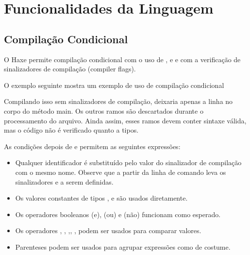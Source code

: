 \chapter{Funcionalidades da Linguagem}
\label{lf}

\section{Compilação Condicional}
\label{lf-condition-compilation}

O Haxe permite compilação condicional com o uso de ,  e  e com a verificação de sinalizadores de compilação (compiler flags).


O exemplo seguinte mostra um exemplo de uso de compilação condicional



Compilando isso sem sinalizadores de compilação, deixaria apenas a linha  no corpo do método main. Os outros ramos são descartados durante o processamento do arquivo. Ainda assim, esses ramos devem conter sintaxe válida, mas o código não é verificado quanto a tipos.

As condições depois de  e  permitem as seguintes expressões:

\begin{itemize}
    \item Qualquer identificador é substituído pelo valor do sinalizador de compilação com o mesmo nome. Observe que  a partir da linha de comando leva os sinalizadores  e  a serem definidas.
    \item Os valores constantes de tipos ,  e  são usados diretamente.
    \item Os operadores booleanos \expr{\&\&} (e), \expr{||} (ou) e \expr{!} (não) funcionam como esperado.
    \item Os operadores \expr{==}, \expr{!=}, \expr{>},\expr{>=}, \expr{<}, \expr{<=} podem ser usados para comparar valores.
    \item Parenteses \expr{()} podem ser usados para agrupar expressões como de costume.
\end{itemize}

